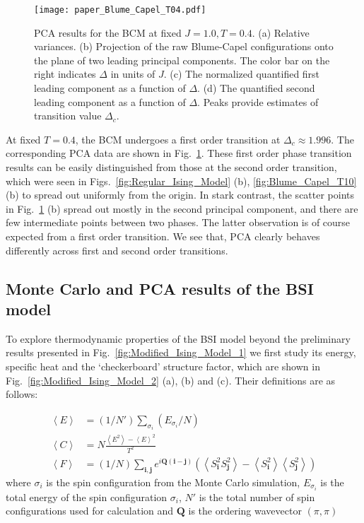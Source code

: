 \documentclass[pra,letterpaper,10pt,twocolumn]{revtex4}
\begin{document}
\begin{figure}[!h]
\texttt{[image: paper\_Blume\_Capel\_T04.pdf]}  
\caption{
PCA results for the BCM at fixed $J=1.0, T=0.4$.  (a)
Relative variances. (b) Projection of the
raw Blume-Capel configurations onto the plane of two leading principal
components. The color bar on the right
indicates $\Delta$ in units of $J$. (c) The normalized quantified
first leading component as a function of $\Delta$. (d) The quantified
second leading component as a function of $\Delta$.
Peaks provide estimates of transition value $\Delta_c$. 
\label{fig:Blume_Capel_T04}
}
\end{figure}

At fixed $T=0.4$, the BCM undergoes a first order
transition at $\Delta_c \approx 1.996$\cite{Kwak}.
The corresponding PCA
data are shown in Fig.~\ref{fig:Blume_Capel_T04}. These first order phase
transition results can be easily distinguished from those
at the second order transition, which were seen in
Figs.~\ref{fig:Regular_Ising_Model} (b), \ref{fig:Blume_Capel_T10} (b)
to spread out uniformly from the origin.  In stark contrast,
the scatter
points in Fig.~\ref{fig:Blume_Capel_T04} (b) spread out mostly in the
second principal component, and there are few intermediate points
between two phases. The latter observation is of course
expected from a first order transition. 
We see that, PCA clearly behaves differently across first
and second order transitions.


\subsection{Monte Carlo and PCA results of the BSI model}


To explore thermodynamic properties of the BSI model beyond the
preliminary results presented in Fig.~\ref{fig:Modified_Ising_Model_1}
we first study its energy, specific heat and the `checkerboard'
structure factor, which are shown in
Fig.~\ref{fig:Modified_Ising_Model_2} (a), (b) and (c). Their
definitions are as follows:

\begin{align}
\left\langle E \right\rangle &= (1/N')\sum_{\sigma_i}(E_{\sigma_i}/N) 
\nonumber \\
\left\langle C \right\rangle &= 
N\frac{\left\langle E^2 \right\rangle - \left\langle E \right\rangle^2}{T^2}
\nonumber \\
\left\langle F \right\rangle &= 
(1/N)\sum_{\mathbf{i}, \mathbf{j}}e^{i\mathbf{Q}(\mathbf{i}-\mathbf{j})}
(\left\langle S^2_{\mathbf{i}} S^2_{\mathbf{j}} \right\rangle 
- \left\langle S^2_{\mathbf{i}} \right\rangle \left\langle S^2_{\mathbf{j}} 
\right\rangle)
\label{eq:BSI_eq_E_C_F}
\end{align}
where $\sigma_i$ is the spin configuration from the Monte Carlo
simulation, $E_{\sigma_i}$ is the total energy of the spin configuration
$\sigma_i$, $N'$ is the total number of spin configurations used for calculation and $\mathbf{Q}$ is the ordering 
wavevector $(\pi,\pi)$
\end{document}
